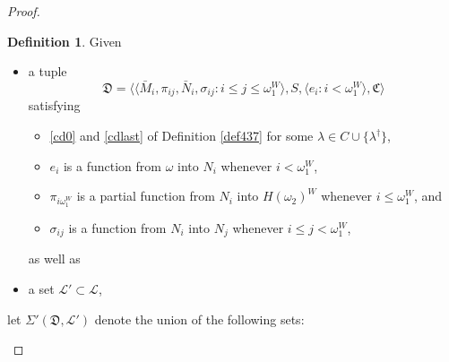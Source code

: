 \documentclass[12pt, twoside]{memoir}
\numberwithin{equation}{section}
\theoremstyle{definition}
\newtheorem{defi}[thm]{Definition}
\theoremstyle{remark}
\theoremstyle{definition}
\theoremstyle{definition}
\theoremstyle{definition}
\theoremstyle{remark}
\begin{document}
\begin{proof}
\begin{defi}\label{def439}
Given 
\begin{itemize}
    \item a tuple
    \begin{equation*}
        \mathfrak{D} = \langle \langle \bar{M}_i, \pi_{ij},  \bar{N}_i, \sigma_{ij} : i \leq j \leq \omega_1^{W} \rangle, S, \langle e_i : i < \omega_1^W \rangle, \mathfrak{C} \rangle
    \end{equation*}
    satisfying 
    \begin{itemize}[label=$\circ$]
        \item \ref{cd0} and \ref{cdlast} of Definition \ref{def437} for some $\lambda \in C \cup \{\lambda^{\dagger}\}$, 
        \item $e_i$ is a function from $\omega$ into $N_i$ whenever $i < \omega_1^W$, 
        \item $\pi_{i\omega_1^W}$ is a partial function from $N_i$ into $H(\omega_2)^W$ whenever $i \leq \omega_1^W$, and
        \item $\sigma_{ij}$ is a function from $N_i$ into $N_j$ whenever $i \leq j < \omega_1^W$,
    \end{itemize}
    as well as 
    \item a set $\mathcal{L}' \subset \mathcal{L}$,
\end{itemize}
let $\Sigma'(\mathfrak{D}, \mathcal{L}')$ denote the union of the following sets:
\end{defi}
\end{proof}
\end{document}
